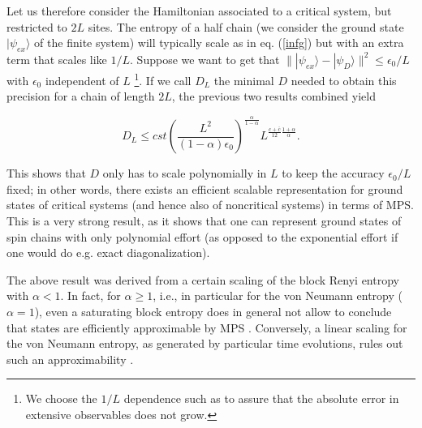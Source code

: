 \documentclass[aps,prl,epsfig,graphics,floatfix,mathbbm,a4paper]{article}
\newcommand{\1}{\mathbbm{1}}
\renewcommand{\>}{\rangle}
\newcommand{\<}{\langle}
\begin{document}
Let us therefore consider the Hamiltonian associated to a critical
system, but restricted to $2L$ sites. The entropy of a half chain
(we consider the ground state $|\psi_{ex}\rangle$ of the finite
system) will typically scale as in eq. (\ref{infg}) but with an
extra term that scales like $1/L$. Suppose we want to get that
$\||\psi_{ex}\rangle-|\psi_D\rangle\|^2\leq\epsilon_0/L$ with
$\epsilon_0$ independent of $L$ \footnote{We choose the $1/L$
    dependence such as to assure that the absolute error in extensive
    observables does not grow.}. If we call $D_L$ the minimal $D$
needed to obtain this precision for a chain of length $2L$, the
previous two results combined yield
\begin{theorem}
    \[D_L\leq
        cst\left(\frac{L^2}{(1-\alpha)\epsilon_0}\right)^{\frac{\alpha}{1-\alpha}}
        L^{\frac{c+\bar{c}}{12}\frac{1+\alpha}{\alpha}}.\]
\end{theorem}
This shows that $D$ only has to scale polynomially in $L$ to keep
the accuracy $\epsilon_0/L$ fixed; in other words, there exists an
efficient scalable representation for ground states of critical
systems (and hence also of noncritical systems) in terms of MPS.
This is a very strong result, as it shows that one can represent
ground states of spin chains with only polynomial effort (as
opposed to the exponential effort if one would do e.g. exact
diagonalization).

The above result was derived from a certain scaling of the block
Renyi entropy with $\alpha<1$. In fact, for $\alpha\geq 1$, i.e.,
in particular for the von Neumann entropy ($\alpha=1$), even a
saturating block entropy does in general not allow to conclude
that states are efficiently approximable by MPS \cite{entropyMPS}.
Conversely, a linear scaling for the von Neumann entropy, as
generated by particular time evolutions, rules out such an
approximability \cite{entropyMPS}.
\end{document}
